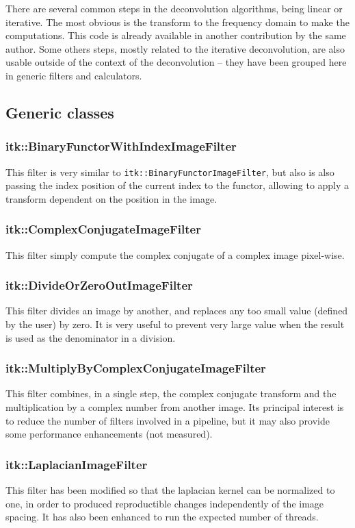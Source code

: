 \documentclass{InsightArticle}
\begin{document}
There are several common steps in the deconvolution algorithms, being linear or iterative. The most obvious is the transform
to the frequency domain to make the computations. This code is already available in another contribution by the same author.
Some others steps, mostly related to the iterative deconvolution, are also usable outside of the context of the deconvolution -- they
have been grouped here in generic filters and calculators.

\subsection{Generic classes}

\subsubsection{itk::BinaryFunctorWithIndexImageFilter}
This filter is very similar to \verb$itk::BinaryFunctorImageFilter$, but also is also passing the index position of the
current index to the functor, allowing to apply a transform dependent on the position in the image.

\subsubsection{itk::ComplexConjugateImageFilter}
This filter simply compute the complex conjugate of a complex image pixel-wise.

\subsubsection{itk::DivideOrZeroOutImageFilter}
This filter divides an image by another, and replaces any too small value (defined by the user) by zero. It is very useful to prevent very large value
when the result is used as the denominator in a division.

\subsubsection{itk::MultiplyByComplexConjugateImageFilter}
This filter combines, in a single step, the complex conjugate transform and the multiplication by a complex number from another image.
Its principal interest is to reduce the number of filters involved in a pipeline, but it may also provide some performance enhancements (not measured).

\subsubsection{itk::LaplacianImageFilter}
This filter has been modified so that the laplacian kernel can be normalized to one, in order to produced reproductible changes
independently of the image spacing. It has also been enhanced to run the expected number of threads.
\end{document}
